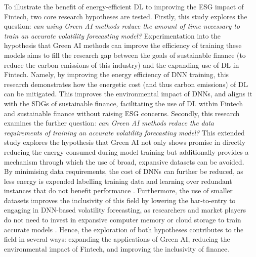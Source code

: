 \documentclass[a4paper, 11pt]{report}
\begin{document}
    To illustrate the benefit of energy-efficient DL to improving the ESG impact of Fintech, two core research hypotheses are tested. Firstly, this study explores the question: \emph{can using Green AI methods reduce the amount of time necessary to train an accurate volatility forecasting model?} Experimentation into the hypothesis that Green AI methods can improve the efficiency of training these models aims to fill the research gap between the goals of sustainable finance (to reduce the carbon emissions of this industry) and the expanding use of DL in Fintech. Namely, by improving the energy efficiency of DNN training, this research demonstrates how the energetic cost (and thus carbon emissions) of DL can be mitigated. This improves the environmental impact of DNNs, and aligns it with the SDGs of sustainable finance, facilitating the use of DL within Fintech and sustainable finance without raising ESG concerns. Secondly, this research examines the further question: \emph{can Green AI methods reduce the data requirements of training an accurate volatility forecasting model?} This extended study explores the hypothesis that Green AI not only shows promise in directly reducing the energy consumed during model training but additionally provides a mechanism through which the use of broad, expansive datasets can be avoided. By minimising data requirements, the cost of DNNs can further be reduced, as less energy is expended labelling training data and learning over redundant instances that do not benefit performance \citep{schwartz-2019}. Furthermore, the use of smaller datasets improves the inclusivity of this field by lowering the bar-to-entry to engaging in DNN-based volatility forecasting, as researchers and market players do not need to invest in expansive computer memory or cloud storage to train accurate models \citep{strubell-2019}. Hence, the exploration of both hypotheses contributes to the field in several ways: expanding the applications of Green AI, reducing the environmental impact of Fintech, and improving the inclusivity of finance.
\end{document}

